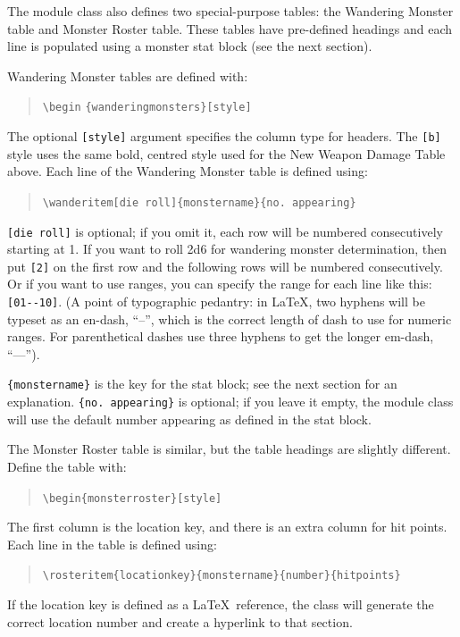 \documentclass[a4paper,serif]{module}
\begin{document}
\vspace{1ex}\noindent The module class also defines two special-purpose tables: the Wandering Monster table and Monster Roster table. These tables
have pre-defined headings and each line is populated using a monster stat block (see the next section).

\noindent Wandering Monster tables are defined with:
\begin{quote}
\verb|\begin| \verb|{wanderingmonsters}[style]|
\end{quote}
The optional \verb|[style]| argument specifies the column type for headers. The \verb|[b]| style uses the same bold,
centred style used for the New Weapon Damage Table above. Each line of the Wandering Monster table is defined using:
\begin{quote}
\verb|\wanderitem[die roll]{monstername}{no. appearing}|
\end{quote}
\verb|[die roll]| is optional; if you omit it, each row will be numbered consecutively starting at 1. If you want to
roll 2d6 for wandering monster determination, then put \verb|[2]| on the first row and the following rows will be numbered
consecutively. Or if you want to use ranges, you can specify the range for each line like this: \verb|[01--10]|.
(A point of typographic pedantry: in \LaTeX, two hyphens will be typeset as an en-dash, ``--'', which is the correct length
of dash to use for numeric ranges. For parenthetical dashes use three hyphens to get the longer em-dash, ``---'').

\verb|{monstername}| is the key for the stat block; see the next section for an explanation.
\verb|{no. appearing}| is optional; if you leave it empty, the module class will use the default number appearing as defined in the stat block.

The Monster Roster table is similar, but the table headings are slightly different. Define the table with:
\begin{quote}
\verb|\begin{monsterroster}[style]|
\end{quote}
The first column is the location key, and there is an extra column for hit points. Each line in
the table is defined using:
\begin{quote}
\hspace{-2em}\verb|\rosteritem{locationkey}{monstername}{number}{hitpoints}|
\end{quote}
If the location key is defined as a \LaTeX~reference, the class will generate the correct location number and create a hyperlink to that section.
\end{document}
